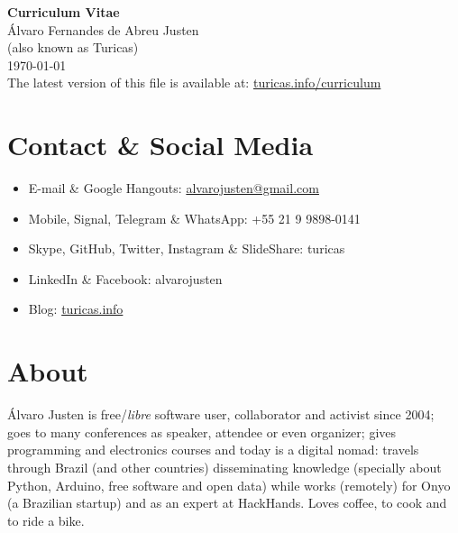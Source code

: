 \documentclass[a4paper,11pt]{article}
\begin{document}
\pagestyle{empty}

\begin{center}
 \huge{\textbf{Curriculum Vitae}}
 \\
 \huge{Álvaro Fernandes de Abreu Justen}
 \\
 \small{(also known as Turicas)}
 \large{\\}
 \large{\today}
 \\
 \small{The latest version of this file is available at:
        \href{http://turicas.info/curriculum}{turicas.info/curriculum}}
\end{center}

\newcommand{\titulo}[1]{\section*{#1}}
\renewcommand{\labelitemi}{$\diamond$}
\renewcommand{\labelitemii}{$\rightarrow$}

\titulo{Contact \& Social Media}
	\begin{itemize}
		\renewcommand{\labelitemi}{}
		\item E-mail \& Google Hangouts: \url{alvarojusten@gmail.com}
		\item Mobile, Signal, Telegram \& WhatsApp: +55 21 9 9898-0141
		\item Skype, GitHub, Twitter, Instagram \& SlideShare: turicas
		\item LinkedIn \& Facebook: alvarojusten
		\item Blog: \href{http://turicas.info/}{turicas.info}
	\end{itemize}

\titulo{About}

Álvaro Justen is free/\textit{libre} software user, collaborator and activist
since 2004; goes to many conferences as speaker, attendee or even organizer;
gives programming and electronics courses and today is a digital nomad: travels
through Brazil (and other countries) disseminating knowledge (specially about
Python, Arduino, free software and open data) while works (remotely) for Onyo
(a Brazilian startup) and as an expert at HackHands. Loves coffee, to cook and
to ride a bike.
\end{document}
